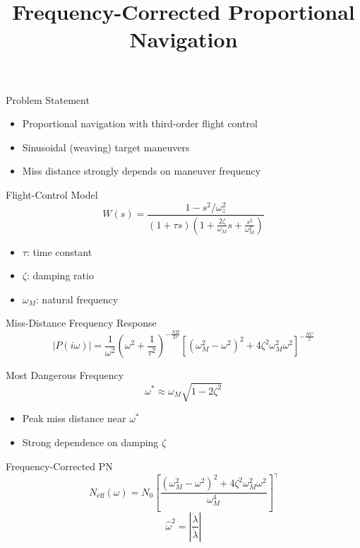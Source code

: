 \documentclass{beamer}
\title{Frequency-Corrected Proportional Navigation}
\author{}
\date{}
\begin{document}
\begin{frame}
\titlepage
\end{frame}

\begin{frame}{Problem Statement}
\begin{itemize}
\item Proportional navigation with third-order flight control
\item Sinusoidal (weaving) target maneuvers
\item Miss distance strongly depends on maneuver frequency
\end{itemize}
\end{frame}

\begin{frame}{Flight-Control Model}
\begin{equation}
W(s)=\frac{1-s^2/\omega_z^2}{(1+\tau s)\left(1+\frac{2\zeta}{\omega_M}s+\frac{s^2}{\omega_M^2}\right)}
\end{equation}
\begin{itemize}
\item $\tau$: time constant
\item $\zeta$: damping ratio
\item $\omega_M$: natural frequency
\end{itemize}
\end{frame}

\begin{frame}{Miss-Distance Frequency Response}
\begin{equation}
|P(i\omega)|=\frac{1}{\omega^2}
\left(\omega^2+\frac{1}{\tau^2}\right)^{-\frac{N B}{2\tau}}
\left[(\omega_M^2-\omega^2)^2+4\zeta^2\omega_M^2\omega^2\right]^{-\frac{N C}{2}}
\end{equation}
\end{frame}

\begin{frame}{Most Dangerous Frequency}
\begin{equation}
\omega^* \approx \omega_M\sqrt{1-2\zeta^2}
\end{equation}
\begin{itemize}
\item Peak miss distance near $\omega^*$
\item Strong dependence on damping $\zeta$
\end{itemize}
\end{frame}

\begin{frame}{Frequency-Corrected PN}
\begin{equation}
N_{\mathrm{eff}}(\omega)=N_0\left[\frac{(\omega_M^2-\omega^2)^2+4\zeta^2\omega_M^2\omega^2}{\omega_M^4}\right]^{\gamma}
\end{equation}
\begin{equation}
\hat\omega^2=\left|\frac{\ddot\lambda}{\dot\lambda}\right|
\end{equation}
\end{frame}
\end{document}
